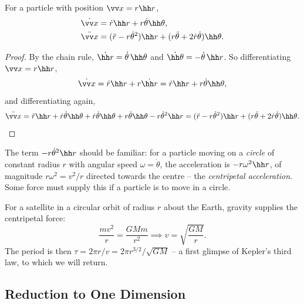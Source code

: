\begin{proposition}
	For a particle with position $\vv x = r \hh r$,
	\begin{align*}
		\dot{\vv x} &= \dot{r} \hh r + r \dot{\theta} \hh \theta, \\
		\ddot{\vv x} &= (\ddot{r} - r \dot{\theta}^2)\hh r + (r \ddot{\theta} + 2 \dot{r}\dot{\theta}) \hh \theta.
	\end{align*}
\end{proposition}
\begin{proof}
	By the chain rule, $\dot{\hh r} = \dot\theta \, \hh \theta$ and $\dot{\hh \theta} = -\dot\theta\, \hh r$. So differentiating $\vv x = r \hh r$,
	$$
	\dot{\vv x} = \dot{r}\hh r + r \dot{\hh r} = \dot{r} \hh r + r \dot{\theta} \hh \theta,
	$$
	and differentiating again,
	\[
	\ddot{\vv x} = \ddot{r} \hh r + \dot{r}\dot{\theta} \hh\theta + \dot{r}\dot\theta \hh \theta + r \ddot{\theta}\hh\theta - r \dot{\theta}^2 \hh r = (\ddot{r} - r \dot\theta^2)\hh r + (r \ddot\theta + 2 \dot{r}\dot\theta)\hh\theta. \qedhere
	\]
\end{proof}

The term $-r\dot\theta^2 \hh r$ should be familiar: for a particle moving on a \emph{circle} of constant radius $r$ with angular speed $\omega = \dot\theta$, the acceleration is $-r\omega^2 \hh r$, of magnitude $r\omega^2 = v^2/r$ directed towards the centre -- the \emph{centripetal acceleration}. Some force must supply this if a particle is to move in a circle.

\begin{example}
	For a satellite in a circular orbit of radius $r$ about the Earth, gravity supplies the centripetal force:
	$$
	\frac{mv^2}{r} = \frac{GMm}{r^2} \implies v = \sqrt{\frac{GM}{r}}.
	$$
	The period is then $\tau = 2\pi r / v = 2\pi r^{3/2}/\sqrt{GM}$ -- a first glimpse of Kepler's third law, to which we will return.
\end{example}

\subsection{Reduction to One Dimension}

